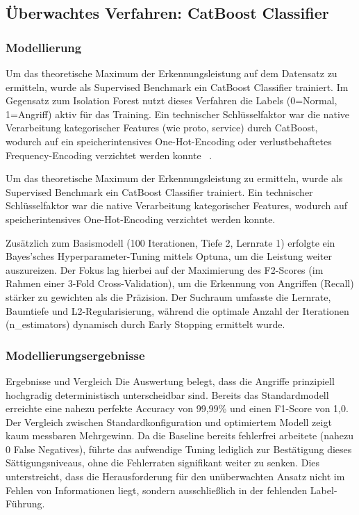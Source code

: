 \documentclass[12pt,oneside]{article}
\begin{document}
	\subsection{Überwachtes Verfahren: CatBoost Classifier}
	\subsubsection{Modellierung}
	Um das theoretische Maximum der Erkennungsleistung auf dem Datensatz zu ermitteln, wurde als Supervised Benchmark ein CatBoost Classifier trainiert. Im Gegensatz zum Isolation Forest nutzt dieses Verfahren die Labels (0=Normal, 1=Angriff) aktiv für das Training. Ein technischer Schlüsselfaktor war die native Verarbeitung kategorischer Features (wie proto, service) durch CatBoost, wodurch auf ein speicherintensives One-Hot-Encoding oder verlustbehaftetes Frequency-Encoding verzichtet werden konnte ~\cite{dorogush2018catboostgradientboostingcategorical}. 

	Um das theoretische Maximum der Erkennungsleistung zu ermitteln, wurde als Supervised Benchmark ein CatBoost Classifier trainiert. Ein technischer Schlüsselfaktor war die native Verarbeitung kategorischer Features, wodurch auf speicherintensives One-Hot-Encoding verzichtet werden konnte.

	Zusätzlich zum Basismodell (100 Iterationen, Tiefe 2, Lernrate 1) erfolgte ein Bayes’sches Hyperparameter-Tuning mittels Optuna, um die Leistung weiter auszureizen. Der Fokus lag hierbei auf der Maximierung des F2-Scores (im Rahmen einer 3-Fold Cross-Validation), um die Erkennung von Angriffen (Recall) stärker zu gewichten als die Präzision. Der Suchraum umfasste die Lernrate, Baumtiefe und L2-Regularisierung, während die optimale Anzahl der Iterationen (n\_estimators) dynamisch durch Early Stopping ermittelt wurde.
	\subsubsection{Modellierungsergebnisse}
	Ergebnisse und Vergleich Die Auswertung belegt, dass die Angriffe prinzipiell hochgradig deterministisch unterscheidbar sind. Bereits das Standardmodell erreichte eine nahezu perfekte Accuracy von 99,99\% und einen F1-Score von 1,0.
	Der Vergleich zwischen Standardkonfiguration und optimiertem Modell zeigt kaum messbaren Mehrgewinn. Da die Baseline bereits fehlerfrei arbeitete (nahezu 0 False Negatives), führte das aufwendige Tuning lediglich zur Bestätigung dieses Sättigungsniveaus, ohne die Fehlerraten signifikant weiter zu senken. Dies unterstreicht, dass die Herausforderung für den unüberwachten Ansatz nicht im Fehlen von Informationen liegt, sondern ausschließlich in der fehlenden Label-Führung.
	\newpage
\end{document}
